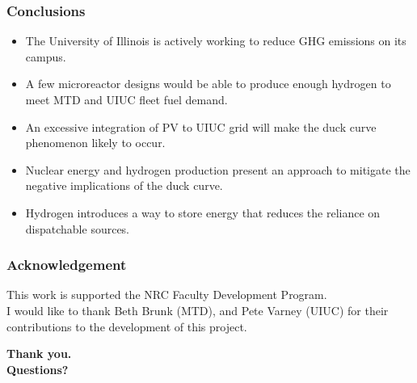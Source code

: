 \begin{frame}
\frametitle{Conclusions}

\begin{itemize}
	\item The University of Illinois is actively working to reduce GHG emissions on its campus. 
	\item A few microreactor designs would be able to produce enough hydrogen to meet MTD and UIUC fleet fuel demand.
	\item An excessive integration of PV to UIUC grid will make the duck curve phenomenon likely to occur.
	\item Nuclear energy and hydrogen production present an approach to mitigate the negative implications of the duck curve.
	\item Hydrogen introduces a way to store energy that reduces the reliance on dispatchable sources.

\end{itemize}
\end{frame}


\begin{frame}
\frametitle{Acknowledgement}

This work is supported the NRC Faculty Development Program.
\\
I would like to thank Beth Brunk (MTD), and Pete Varney (UIUC) for their contributions to the development of this project.

\end{frame}


\begin{frame}
  \begin{center}
    \Huge{\textbf{Thank you.\\ Questions?}}
  \end{center}
\end{frame}
